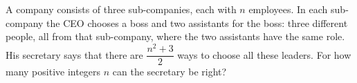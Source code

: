 A company consists of three sub-companies, each with $n$ employees. In each sub-company the CEO chooses a boss and two assistants for the boss: three different people, all from that sub-company, where the two assistants have the same role. His secretary says that there are $\dfrac{n^2+3}{2}$ ways to choose all these leaders. For how many positive integers $n$ can the secretary be right?
